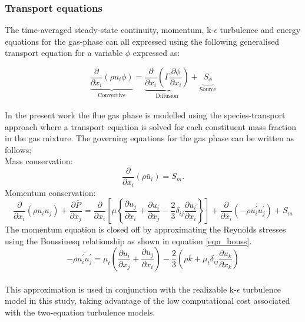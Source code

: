 \documentclass{webofc}
\begin{document}
\subsubsection{Transport equations}
The time-averaged steady-state continuity, momentum, k-$\epsilon$ turbulence  and energy equations for the gas-phase can all expressed using the following generalised transport equation for a variable $\phi$ expressed as:

\begin{equation}\label{eqn_general}
\underbrace{\frac{\partial}{\partial x_{i}}(\rho u_{i}\phi)}_{\text{Convective}}= \underbrace{\frac{\partial}{\partial x_{i}}(\Gamma\frac{\partial \phi}{\partial x_{i}})}_{\text{Diffusion}}+\underbrace{S_{\phi}}_{\text{Source}} 
\end{equation}\\
In the present work the flue gas phase is modelled using the species-transport approach where a transport equation is solved for each constituent mass fraction in the gas mixture. The governing equations for the gas phase can be written as follows;\\
Mass conservation:
\begin{equation}\label{eqn_RANS_mass}
\frac{\partial}{\partial x_{i}}(\rho \bar{u}_{i})=S_{m}.
\end{equation}
Momentum conservation:
\\
\begin{equation}\label{eqn_momentum}
\frac{\partial}{\partial x_{i}}(\rho u_{i}u_{j})+\frac{\partial \overline{P}}{\partial x_{j}}=\frac{\partial}{\partial x_{i}}\left[\mu\left\{\frac{\partial u_{j}}{\partial x_{i}}+\frac{\partial u_{i}}{\partial x_{j}}-\frac{2}{3}\delta_{ij}\frac{\partial u_{i}}{\partial x_{i}}\right\}\right]+\frac{\partial}{\partial x_{i}}(-\rho\overline{u_{i}^{'}u_{j}^{'}})+S_m
\end{equation}
The momentum equation is closed off by approximating the Reynolds stresses using the Boussinesq relationship as shown in equation \ref{eqn_bouss}.
\begin{equation}\label{eqn_bouss}
-\rho\overline{u_{i}^{'}u_{j}^{'}}=\mu_{t}\left(\frac{\partial u_{i}}{\partial x_{j}}+\frac{\partial u_{j}}{\partial x_{i}}\right)-\frac{2}{3}\left(\rho k+\mu_{t}\delta_{ij}\frac{\partial u_{k}}{\partial x_{k}}\right)
\end{equation}
\\
This approximation is used in conjunction with the realizable k-$\epsilon$ turbulence model \cite{shih} in this study, taking advantage of the low computational cost associated with the two-equation turbulence models. 
\end{document}
